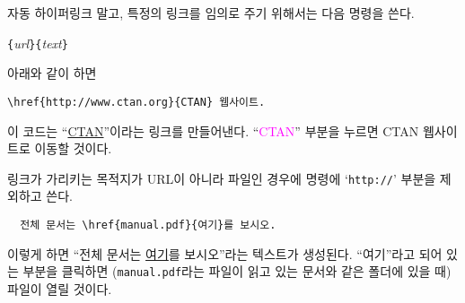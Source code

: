 
자동 하이퍼링크 말고, 특정의 링크를 임의로 주기 위해서는 다음 명령을 쓴다.
\begin{lscommand}
\verb|{|\emph{url}\verb|}{|\emph{text}\verb|}|
\end{lscommand}

아래와 같이 하면
\begin{code}
\begin{verbatim}
\href{http://www.ctan.org}{CTAN} 웹사이트.
\end{verbatim}
\end{code}
이 코드는 ``\href{http://www.ctan.org}{CTAN}''이라는 링크를 만들어낸다.
``\textcolor{magenta}{CTAN}'' 부분을 누르면 CTAN 웹사이트로 이동할 것이다.

링크가 가리키는 목적지가 URL이 아니라 파일인 경우에  명령에 `\texttt{http://}' 부분을 제외하고 쓴다.
\begin{verbatim}
  전체 문서는 \href{manual.pdf}{여기}를 보시오.
\end{verbatim}
이렇게 하면 ``전체 문서는 \href{manual.pdf}{여기}를 보시오''라는 텍스트가 생성된다. ``여기''라고 되어 있는 부분을 클릭하면 (\verb|manual.pdf|라는 파일이 읽고 있는 문서와 같은 폴더에 있을 때) 파일이 열릴 것이다.

